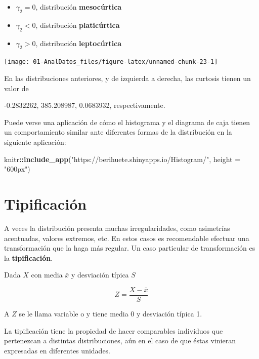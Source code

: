 \documentclass[]{book}
\newenvironment{Shaded}{\begin{snugshade}}{\end{snugshade}}
\newcommand{\KeywordTok}[1]{\textcolor[rgb]{0.13,0.29,0.53}{\textbf{#1}}}
\newcommand{\DataTypeTok}[1]{\textcolor[rgb]{0.13,0.29,0.53}{#1}}
\newcommand{\StringTok}[1]{\textcolor[rgb]{0.31,0.60,0.02}{#1}}
\newcommand{\OperatorTok}[1]{\textcolor[rgb]{0.81,0.36,0.00}{\textbf{#1}}}
\newcommand{\NormalTok}[1]{#1}
\theoremstyle{definition}
\theoremstyle{definition}
\theoremstyle{definition}
\theoremstyle{remark}
\begin{document}
\begin{itemize}
\item
  \(\gamma_2= 0\), distribución \textbf{mesocúrtica}
\item
  \(\gamma_2< 0\), distribución \textbf{platicúrtica}
\item
  \(\gamma_2> 0\), distribución \textbf{leptocúrtica}
\end{itemize}

\begin{center}\texttt{[image: 01-AnalDatos\_files/figure-latex/unnamed-chunk-23-1]} \end{center}

En las distribuciones anteriores, y de izquierda a derecha, las curtosis
tienen un valor de

-0.2832262, 385.208987, 0.0683932, respectivamente.

Puede verse una aplicación de cómo el histograma y el diagrama de caja
tienen un comportamiento similar ante diferentes formas de la
distribución en la siguiente aplicación:

\begin{Shaded}
\begin{Highlighting}[]
\NormalTok{knitr}\OperatorTok{::}\KeywordTok{include_app}\NormalTok{(}\StringTok{"https://berihuete.shinyapps.io/Histogram/"}\NormalTok{, }
  \DataTypeTok{height =} \StringTok{"600px"}\NormalTok{)}
\end{Highlighting}
\end{Shaded}

\section{Tipificación}\label{tipificacion}

A veces la distribución presenta muchas irregularidades, como asimetrías
acentuadas, valores extremos, etc. En estos casos es recomendable
efectuar una transformación que la haga más regular. Un caso particular
de transformación es la \textbf{tipificación}.

Dada \(X\) con media \(\bar{x}\) y desviación típica \(S\)

\[Z  =  \frac{X  -  \bar{x}}{S}\]

A \(Z\) se le llama variable o y tiene media 0 y desviación típica 1.

La tipificación tiene la propiedad de hacer comparables individuos que
pertenezcan a distintas distribuciones, aún en el caso de que éstas
vinieran expresadas en diferentes unidades.
\end{document}

